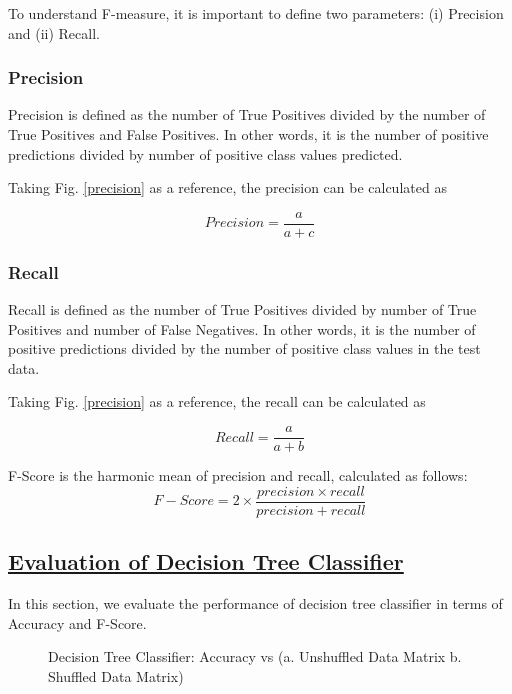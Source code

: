 \documentclass[journal,onecolumn]{IEEEtran}
\begin{document}
To understand F-measure, it is important to define two parameters: (i) Precision and (ii) Recall.
\subsubsection{\textbf{Precision}}
Precision is defined as the number of True Positives divided by the number of True Positives and False Positives. In other words, it is the number of positive predictions divided by number of positive class values predicted. 

Taking Fig. \ref{precision} as a reference, the precision can be calculated as

\begin{equation}
Precision = \frac{a}{a+c}
\end{equation}


\subsubsection{\textbf{Recall}}
Recall is defined as the number of True Positives divided by number of True Positives and number of False Negatives. In other words, it is the number of positive predictions divided by the number of positive class values in the test data.

Taking Fig. \ref{precision} as a reference, the recall can be calculated as

\begin{equation}
Recall = \frac{a}{a+b}
\end{equation}

F-Score is the harmonic mean of precision and recall, calculated as follows:
\begin{equation}
F-Score = 2 \times \frac{precision \times recall }{precision + recall}
\end{equation}


\subsection{\underline{Evaluation of Decision Tree Classifier }}
In this section, we evaluate the performance of decision tree classifier in terms of Accuracy and F-Score.
\begin{figure}[h]
\begin{center}
\label{thr}
\caption{ Decision Tree Classifier: Accuracy vs (a. Unshuffled Data Matrix  b. Shuffled Data Matrix) }

\end{center}
\end{figure}
\end{document}
